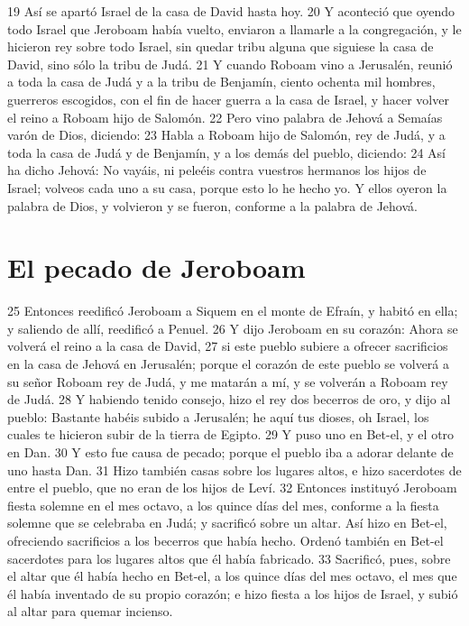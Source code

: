 19 Así se apartó Israel de la casa de David hasta hoy.
20 Y aconteció que oyendo todo Israel que Jeroboam había vuelto, enviaron a llamarle a la congregación, y le hicieron rey sobre todo Israel, sin quedar tribu alguna que siguiese la casa de David, sino sólo la tribu de Judá.
21 Y cuando Roboam vino a Jerusalén, reunió a toda la casa de Judá y a la tribu de Benjamín, ciento ochenta mil hombres, guerreros escogidos, con el fin de hacer guerra a la casa de Israel, y hacer volver el reino a Roboam hijo de Salomón.
22 Pero vino palabra de Jehová a Semaías varón de Dios, diciendo:
23 Habla a Roboam hijo de Salomón, rey de Judá, y a toda la casa de Judá y de Benjamín, y a los demás del pueblo, diciendo:
24 Así ha dicho Jehová: No vayáis, ni peleéis contra vuestros hermanos los hijos de Israel; volveos cada uno a su casa, porque esto lo he hecho yo. Y ellos oyeron la palabra de Dios, y volvieron y se fueron, conforme a la palabra de Jehová.
\section*{El pecado de Jeroboam}

25 Entonces reedificó Jeroboam a Siquem en el monte de Efraín, y habitó en ella; y saliendo de allí, reedificó a Penuel.
26 Y dijo Jeroboam en su corazón: Ahora se volverá el reino a la casa de David,
27 si este pueblo subiere a ofrecer sacrificios en la casa de Jehová en Jerusalén; porque el corazón de este pueblo se volverá a su señor Roboam rey de Judá, y me matarán a mí, y se volverán a Roboam rey de Judá.
28 Y habiendo tenido consejo, hizo el rey dos becerros de oro, y dijo al pueblo: Bastante habéis subido a Jerusalén; he aquí tus dioses, oh Israel, los cuales te hicieron subir de la tierra de Egipto. 
29 Y puso uno en Bet-el, y el otro en Dan.
30 Y esto fue causa de pecado; porque el pueblo iba a adorar delante de uno hasta Dan.
31 Hizo también casas sobre los lugares altos, e hizo sacerdotes de entre el pueblo, que no eran de los hijos de Leví.
32 Entonces instituyó Jeroboam fiesta solemne en el mes octavo, a los quince días del mes, conforme a la fiesta solemne que se celebraba en Judá; y sacrificó sobre un altar. Así hizo en Bet-el, ofreciendo sacrificios a los becerros que había hecho. Ordenó también en Bet-el sacerdotes para los lugares altos que él había fabricado.
33 Sacrificó, pues, sobre el altar que él había hecho en Bet-el, a los quince días del mes octavo, el mes que él había inventado de su propio corazón; e hizo fiesta a los hijos de Israel, y subió al altar para quemar incienso.

